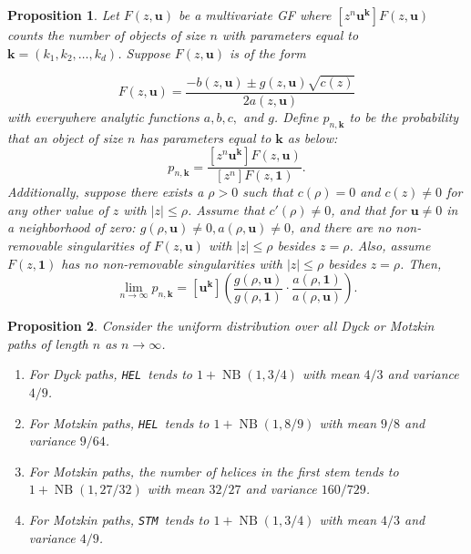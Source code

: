 \documentclass[10pt,a4paper]{amsart}
\newtheorem{proposition}{Proposition}
\newcommand{\FirstHelix}{{\tt HEL}}
\DeclareMathOperator{\NB}{NB}
\newcommand{\STM}{{\tt STM}}
\begin{document}
\begin{proposition} \label{prop:GF}
Let $F(z, \mathbf{u})$ be a multivariate GF where $[z^n\mathbf{u}^\mathbf{k}]F(z, \mathbf{u})$ counts the number of objects of size $n$ with parameters equal to $\mathbf{k} = (k_1, k_2, \ldots, k_d)$.  Suppose $F(z, \mathbf{u})$ is of the form
   
    \[
    F(z, \mathbf{u}) = \frac{-b(z, \mathbf{u}) \pm g(z, \mathbf{u}) \sqrt{c(z)}}{2a(z, \mathbf{u})}
    \]
    with everywhere analytic functions $a, b, c,$ and $g$. Define $p_{n, \mathbf{k}}$ to be the probability that an object of size $n$ has parameters equal to $\mathbf{k}$ as below:
    \[
    p_{n, \mathbf{k}} = \frac{[z^n\mathbf{u}^\mathbf{k}] F(z, \mathbf{u})}{[z^n]F(z, \mathbf{1})}.
    \]
    Additionally, suppose there exists a $\rho > 0$ such that $c(\rho) = 0$ and $c(z) \neq 0$ for any other value of $z$ with $|z| \leq \rho$.  Assume that $c'(\rho) \neq 0$, and that for $\mathbf{u} \neq 0$ in a neighborhood of zero: $g(\rho, \mathbf{u}) \neq 0, a(\rho, \mathbf{u}) \neq 0$, and there are no non-removable singularities of $F(z, \mathbf{u})$ with $|z| \leq \rho$ besides $z = \rho$.  Also, assume $F(z, \mathbf{1})$ has no non-removable singularities with $|z| \leq \rho$ besides $z = \rho$. Then,
    \[
    \lim_{n \to \infty} p_{n, \mathbf{k}} = [\mathbf{u}^\mathbf{k}] \left(\frac{g(\rho, \mathbf{u})}{g(\rho, \mathbf{1})} \cdot \frac{a(\rho, \mathbf{1})}{a(\rho, \mathbf{u})}\right).
    \]
\end{proposition}

\begin{proposition} \label{prop:DyckMotzkinDepth}
Consider the uniform distribution over all Dyck or Motzkin paths of length $n$ as $n \to \infty$.
\begin{enumerate}
    \item For Dyck paths, \FirstHelix\ tends to $1 + \NB(1, 3/4)$ with mean $4/3$ and variance $4/9$.
    \item For Motzkin paths, \FirstHelix\ tends to $1 + \NB(1, 8/9)$ with mean $9/8$ and variance $9/64$.
    \item For Motzkin paths, the number of helices in the first stem tends to $1 + \NB(1, 27/32)$ with mean $32/27$ and variance $160/729$.
    \item For Motzkin paths, \STM\ tends to $1 + \NB(1, 3/4)$ with mean $4/3$ and variance $4/9$.
\end{enumerate}
\end{proposition}
\end{document}
